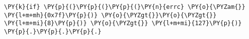 \begin{Verbatim}[commandchars=\\\{\},codes={\catcode`\$=3\catcode`\^=7\catcode`\_=8}]
\PY{k}{if} \PY{p}{(}\PY{p}{(}\PY{p}{(}\PY{n}{errc} \PY{o}{\PYZam{}} \PY{l+m+mh}{0x7f}\PY{p}{)} \PY{o}{\PYZgt{}}\PY{o}{\PYZgt{}} \PY{l+m+mi}{8}\PY{p}{)} \PY{o}{\PYZgt{}} \PY{l+m+mi}{127}\PY{p}{)} \PY{p}{.}\PY{p}{.}\PY{p}{.}
\end{Verbatim}
